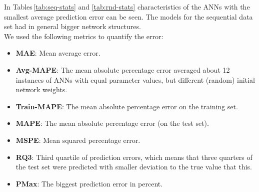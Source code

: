 \documentclass{superfri}
\begin{document}
In Tables\,\ref{tab:seq-stats} and \ref{tab:rnd-stats} characteristics of the ANNs with the smallest average prediction error can be seen.
The models for the sequential data set had in general bigger network structures.
\\
We used the following metrics to quantify the error:
\begin{itemize}
	\item \textbf{MAE}: Mean average error.
	\item \textbf{Avg-MAPE}: The mean absolute percentage error averaged about 12 instances of ANNs with equal parameter values, but different (random) initial network weights.
	\item \textbf{Train-MAPE}: The mean absolute percentage error on the training set. 
	\item \textbf{MAPE}: The mean absolute percentage error (on the test set).
	\item \textbf{MSPE}: Mean squared percentage error.
	\item \textbf{RQ3}: Third quartile of prediction errors, which means that three quarters of the test set were predicted with smaller deviation to the true value that this.
	\item \textbf{PMax}: The biggest prediction error in percent.
\end{itemize}
\end{document}
